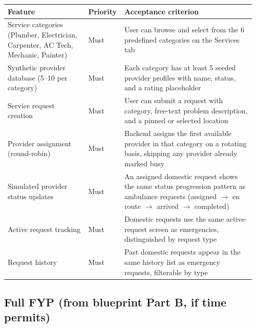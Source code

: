 \documentclass[11pt,a4paper]{article}
\begin{document}
\begin{longtable}{p{0.32\linewidth} p{0.12\linewidth} p{0.52\linewidth}}
\toprule
\textbf{Feature} & \textbf{Priority} & \textbf{Acceptance criterion} \\
\midrule
\endhead
Service categories (Plumber, Electrician, Carpenter, AC Tech, Mechanic, Painter) & Must & User can browse and select from the 6 predefined categories on the Services tab \\
\addlinespace
Synthetic provider database (5--10 per category) & Must & Each category has at least 5 seeded provider profiles with name, status, and a rating placeholder \\
\addlinespace
Service request creation & Must & User can submit a request with category, free-text problem description, and a pinned or selected location \\
\addlinespace
Provider assignment (round-robin) & Must & Backend assigns the first available provider in that category on a rotating basis, skipping any provider already marked busy \\
\addlinespace
Simulated provider status updates & Must & An assigned domestic request shows the same status progression pattern as ambulance requests (assigned $\rightarrow$ en route $\rightarrow$ arrived $\rightarrow$ completed) \\
\addlinespace
Active request tracking & Must & Domestic requests use the same active-request screen as emergencies, distinguished by request type \\
\addlinespace
Request history & Must & Past domestic requests appear in the same history list as emergency requests, filterable by type \\
\bottomrule
\end{longtable}

\subsection{Full FYP (from blueprint Part B, if time permits)}
\end{document}
